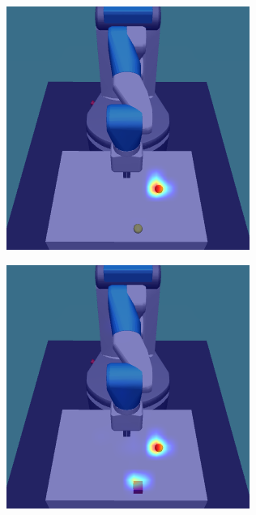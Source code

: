 \begin{figure}[h!]
  \begin{subfigure}{0.24\columnwidth}
    \includegraphics[width=\linewidth]{figures/chapter6/distractor_saliency_fetch_pro_on/color_sensor_random}
  \end{subfigure}
  \begin{subfigure}{0.24\columnwidth}
    \includegraphics[width=\linewidth]{figures/chapter6/distractor_saliency_fetch_pro_on/shape_sensor_random}

\end{subfigure}
\end{figure}
